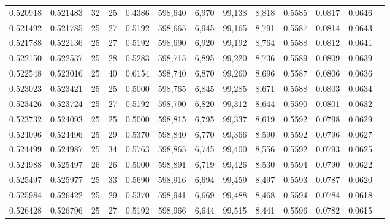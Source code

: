 \begin{tabular}{rrrrrrrrrrrrr}
0.520918 & 0.521483 &    32 &  25 &                                     0.4386 & 598,640 &   6,970 &  99,138 &   8,818 & 0.5585 & 0.0817 & 0.0646 \\
0.521492 & 0.521785 &    25 &  27 &                                     0.5192 & 598,665 &   6,945 &  99,165 &   8,791 & 0.5587 & 0.0814 & 0.0643 \\
0.521788 & 0.522136 &    25 &  27 &                                     0.5192 & 598,690 &   6,920 &  99,192 &   8,764 & 0.5588 & 0.0812 & 0.0641 \\
0.522150 & 0.522537 &    25 &  28 &                                     0.5283 & 598,715 &   6,895 &  99,220 &   8,736 & 0.5589 & 0.0809 & 0.0639 \\
0.522548 & 0.523016 &    25 &  40 &                                     0.6154 & 598,740 &   6,870 &  99,260 &   8,696 & 0.5587 & 0.0806 & 0.0636 \\
0.523023 & 0.523421 &    25 &  25 &                                     0.5000 & 598,765 &   6,845 &  99,285 &   8,671 & 0.5588 & 0.0803 & 0.0634 \\
0.523426 & 0.523724 &    25 &  27 &                                     0.5192 & 598,790 &   6,820 &  99,312 &   8,644 & 0.5590 & 0.0801 & 0.0632 \\
0.523732 & 0.524093 &    25 &  25 &                                     0.5000 & 598,815 &   6,795 &  99,337 &   8,619 & 0.5592 & 0.0798 & 0.0629 \\
0.524096 & 0.524496 &    25 &  29 &                                     0.5370 & 598,840 &   6,770 &  99,366 &   8,590 & 0.5592 & 0.0796 & 0.0627 \\
0.524499 & 0.524987 &    25 &  34 &                                     0.5763 & 598,865 &   6,745 &  99,400 &   8,556 & 0.5592 & 0.0793 & 0.0625 \\
0.524988 & 0.525497 &    26 &  26 &                                     0.5000 & 598,891 &   6,719 &  99,426 &   8,530 & 0.5594 & 0.0790 & 0.0622 \\
0.525497 & 0.525977 &    25 &  33 &                                     0.5690 & 598,916 &   6,694 &  99,459 &   8,497 & 0.5593 & 0.0787 & 0.0620 \\
0.525984 & 0.526422 &    25 &  29 &                                     0.5370 & 598,941 &   6,669 &  99,488 &   8,468 & 0.5594 & 0.0784 & 0.0618 \\
0.526428 & 0.526796 &    25 &  27 &                                     0.5192 & 598,966 &   6,644 &  99,515 &   8,441 & 0.5596 & 0.0782 & 0.0615 \\

\end{tabular}
